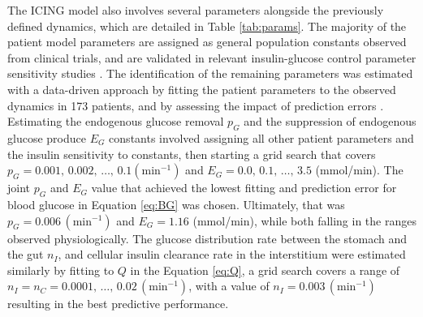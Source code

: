 \documentclass[nomenclature, english, bibtex]{kththesis}
\begin{document}
The \gls{ICING} model also involves several parameters alongside the previously defined dynamics, which are detailed in Table \ref{tab:params}. The majority of the patient model parameters are assigned as general population constants observed from clinical trials, and are validated in relevant insulin-glucose control parameter sensitivity studies \cite{hann_integral-based_2005} \cite{compte_blood_2009} \cite{chase_adaptive_2005}. The identification of the remaining parameters was estimated with a data-driven approach by fitting the patient parameters to the observed dynamics in 173 patients, and by assessing the impact of prediction errors \cite{chase_adaptive_2005}. Estimating the endogenous glucose removal $p_G$ and the suppression of endogenous glucose produce $E_G$ constants involved assigning all other patient parameters and the insulin sensitivity to constants, then starting a grid search that covers $p_G = 0.001, \,0.002, \,\dots, \,0.1 (\text{min}^{-1})$ and $E_G = 0.0, \,0.1, \,\dots, \,3.5$ (mmol/min). The joint $p_G$ and $E_G$ value that achieved the lowest fitting and prediction error for blood glucose in Equation \eqref{eq:BG} was chosen. Ultimately, that was $p_G = 0.006 \,(\text{min}^{-1})$ and $E_G = 1.16$ (mmol/min), while both falling in the ranges observed physiologically. The glucose distribution rate between the stomach and the gut $n_I$, and cellular insulin clearance rate in the interstitium were estimated similarly by fitting to $Q$ in the Equation \eqref{eq:Q}, a grid search covers a range of $n_I = n_C = 0.0001, \,\dots, \,0.02 \,(\text{min}^{-1})$, with a value of $n_I = 0.003 \, (\text{min}^{-1})$ resulting in the best predictive performance.
\end{document}
